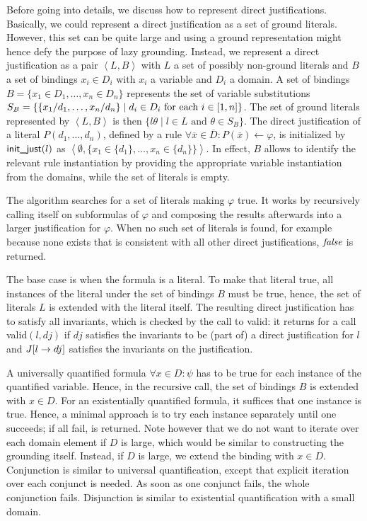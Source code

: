 \documentclass[11pt]{article}
\newcommand{\m}[1]{\ensuremath{#1}\xspace}
\newcommand{\lrule}{\m{\leftarrow}}
\newcommand{\f}{\m{\varphi}}
\newcommand{\xxx}{\m{\overline{x}}}
\newcommand{\DDD}{\m{\overline{D}}}
\newcommand{\typed}[2]{\m{#1\in #2:}}
\newcommand{\tuple}[1]{\m{\left \langle #1 \right \rangle }}
\theoremstyle{plain}
\theoremstyle{definition}
\theoremstyle{example_basic}
\theoremstyle{example_contd}
\theoremstyle{plain}
\newcommand{\change}[1]{#1}
\begin{document}
Before going into details, we discuss how to represent direct justifications. Basically, we could represent a direct justification as a set of ground literals. However, this set can be quite large and using a ground representation might hence defy the purpose of lazy grounding. Instead, we represent a direct justification as a pair $\tuple{L,B}$ with $L$ a set of possibly non-ground literals and $B$ a set of bindings $x_i \in D_i$ with $x_i$ a variable and $D_i$ a domain. A set of bindings $B=\{x_1 \in D_1, \ldots, x_n \in D_n\}$ represents the set of variable substitutions $S_B=\{\{x_1\subs d_1, \ldots, x_n \subs d_n\} \mid d_i \in D_i \text{ for each } i \in [1,n]\}$. The set of ground literals represented by $\tuple{L,B}$ is then $\{l\theta \mid l \in L \mbox{ and } \theta \in S_B\}$. The direct justification of a literal $P(d_1,\ldots,d_n)$, defined by a rule $\forall \xxx \in \DDD: P(\xxx) \lrule \f$, is initialized by $\textsf{init\_just}{}(l)$ as $\tuple{\emptyset,\{x_1 \in \{d_1\}, \ldots, x_n \in \{d_n\}\}}$. In effect, $B$ allows to identify the relevant rule instantiation by providing the appropriate variable instantiation from the domains, while the set of literals is empty.

The \buildconstr algorithm  searches for a set of literals making \f true. It works by recursively calling itself on subformulas of \f and composing the results afterwards into a larger justification for \f. \change{When no such set of literals is found, for example because none exists that is consistent with all other direct justifications, $\mathit{false}$ is returned}.

The base case is when the formula is a literal. To make that literal true, all instances of the literal under the set of bindings $B$ must be true, hence, the set of literals $L$ is extended with the literal itself. The resulting direct justification has to satisfy all invariants, which is checked by the call to \textsf{valid}: it returns \algtrue for a call \textsf{valid}$(l,dj)$ if $dj$ satisfies the invariants to be (part of) a direct justification for $l$ and $J[l \rightarrow dj]$ satisfies the invariants on the justification.

A universally quantified formula $\forall \typed{x}{D} \psi$ has to be
true for each instance of the quantified variable. Hence, in the
recursive call, the set of bindings $B$ is extended with $x \in
D$. For an existentially quantified formula, it suffices that one
instance is true. Hence, a minimal approach is to try each instance
separately until one succeeds; if all fail, \algfalse is
returned. Note however that we do not want to iterate over each domain
element if $D$ is large, which would be similar to constructing the
grounding itself. Instead, if $D$ is large, we extend the binding with
$x\in D$. Conjunction is similar to universal quantification, except
that explicit iteration over each conjunct is needed. As soon as one
conjunct fails, the whole conjunction fails. Disjunction is similar to
existential quantification \change{with a small domain}.
\end{document}
